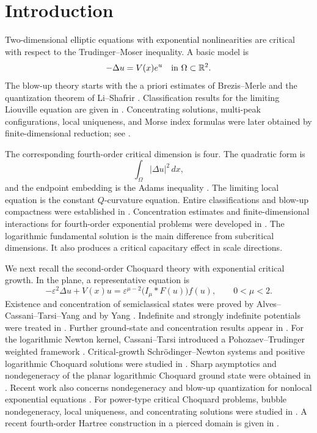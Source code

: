 \documentclass[11pt]{article}
\numberwithin{equation}{section}
\begin{document}
\section{Introduction}

Two-dimensional elliptic equations with exponential nonlinearities are
critical with respect to the Trudinger--Moser inequality.  A basic
model is
\[
-\Delta u=V(x)e^u
\quad\hbox{in }\Omega\subset\mathbb R^2.
\]
The blow-up theory starts with the a priori estimates of
Brezis--Merle and the quantization theorem of Li--Shafrir
\cite{BrezisMerle,LiShafrir}.  Classification results for the limiting
Liouville equation are given in \cite{ChenLi,ChenLiOu}.  Concentrating
solutions, multi-peak configurations, local uniqueness, and Morse
index formulas were later obtained by finite-dimensional reduction;
see \cite{DelPinoKowalczykMusso,GladialiGrossiOhtsukaSuzuki}.

The corresponding fourth-order critical dimension is four.  The
quadratic form is
\[
\int_\Omega |\Delta u|^2\,dx,
\]
and the endpoint embedding is the Adams inequality
\cite{Adams}.  The limiting local equation is the constant
$Q$-curvature equation.  Entire classifications and blow-up
compactness were established in
\cite{Lin,WeiXu,Martinazzi,MartinazziCC}.  Concentration estimates and
finite-dimensional interactions for fourth-order exponential
problems were developed in
\cite{DruetRobert,LinWeiFourthOrder}.  The logarithmic fundamental
solution is the main difference from subcritical dimensions.  It also
produces a critical capacitary effect in scale directions.

We next recall the second-order Choquard theory with exponential
critical growth.  In the plane, a representative equation is
\[
-\varepsilon^2\Delta u+V(x)u
=\varepsilon^{\mu-2}
\bigl(I_\mu*F(u)\bigr)f(u),
\qquad 0<\mu<2.
\]
Existence and concentration of semiclassical states were proved by
Alves--Cassani--Tarsi--Yang and by Yang
\cite{AlvesCassaniTarsiYang,YangPlanarChoquard}.  Indefinite and
strongly indefinite potentials were treated in
\cite{QinTang,GaoChenQinWu}.  Further ground-state and concentration
results appear in
\cite{ZhangLiaoTangQin,ChenLiWangQuasilinear,DengTianXiong}.
For the logarithmic Newton kernel, Cassani--Tarsi introduced a
Pohozaev--Trudinger weighted framework
\cite{CassaniTarsi}.  Critical-growth Schr\"odinger--Newton systems
and positive logarithmic Choquard solutions were studied in
\cite{LiuRadulescuZhang,CassaniDuLiu}.
Sharp asymptotics and nondegeneracy of the planar logarithmic
Choquard ground state were obtained in
\cite{BonheureCingolaniVanSchaftingen}.  Recent work also concerns
nondegeneracy and blow-up quantization for nonlocal exponential
equations \cite{GaoLiMa,Gluck}.  For power-type critical Choquard problems, bubble
nondegeneracy, local uniqueness, and concentrating solutions were
studied in
\cite{Lenzmann,DuYang,SquassinaYangZhao,LiLiuTangXu,GhimentiHuangPistoia,CannoneCingolaniYangZhao,ChenWangSubcritical,ChenWangMultiple}.
A recent fourth-order Hartree construction in a pierced domain is
given in \cite{TanYangBubbleTower}.
\end{document}
